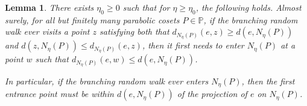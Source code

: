 \documentclass{amsart}
\newcommand{\showcomments}{yes}
\newenvironment{comment}%
{\ifthenelse{\equal{\showcomments}{yes}}%
{\footnotemark
    \begin{lrbox}{\commentbox}
    \begin{minipage}[t]{1.25in}\raggedright\sffamily\upshape\tiny
    \footnotemark[\arabic{footnote}]}%
{\begin{lrbox}{\commentbox}}}%
{\ifthenelse{\equal{\showcomments}{yes}}%
{\end{minipage}\end{lrbox}\marginpar{\usebox{\commentbox}}}%
{\end{lrbox}}}
\newtheorem{lem}[thm]{Lemma}
\theoremstyle{definition}
\theoremstyle{remark}
\newcommand{\ywy}[1]{{\color{red}{#1}}}
\begin{document}

\begin{lem}\label{exponentialmoments}
There exists $\eta_0\geq 0$ such that for $\eta\geq \eta_0$, the following holds.
Almost surely, for all but finitely many parabolic cosets $P\in \mathbb P$,  if the branching random walk ever visits a point $z$ satisfying 
both that $d_{N_\eta(P)}(e,z)\geq d(e,N_\eta(P))$ and $d(z,N_\eta(P))\leq  d_{N_\eta(P)}(e,z)$, then it first needs to enter $N_\eta(P)$ at a point $w$ such that $d_{N_\eta(P)}(e,w)\leq d(e,N_\eta(P))$.

In particular, if the branching random walk ever enters $N_\eta(P)$, then the first entrance point must be within $d(e,N_\eta(P))$ of the projection of $e$ on $N_\eta(P)$.
\end{lem}


\end{document}

